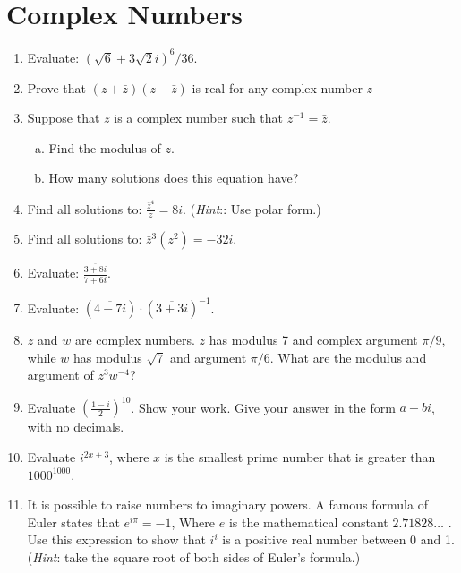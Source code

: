 \section{Complex Numbers}

\begin{enumerate}

\item
Evaluate: $(\sqrt{6}+3\sqrt{2}i)^6/36$.

\item
Prove that  $(z + \bar{z})(z - \bar{z})$ is real for any complex number $z$

\item
Suppose that $z$ is a complex number such that $z^{-1} = \bar{z}$.
\begin{enumerate}[(a)]
\item
 Find the modulus of $z$.
\item
How many solutions does this equation have?
\end{enumerate}
	
\item
Find all solutions to:  $\displaystyle{\frac{\bar{z}^4}{z} = 8i.}$
(\emph{Hint}:: Use polar form.)

\item
Find all solutions to:  $\bar{z}^3(z^2) = -32i.$
\item
Evaluate:  $\displaystyle{\frac{ \overline{3 + 8i} }{7 + 6i}}$.
\item
Evaluate:  $\displaystyle{( \overline{4 -7i} ) \cdot (\overline{3 + 3i})^{-1}}$.
\item
$z$ and $w$ are complex numbers. $z$ has modulus 7 and complex argument $\pi/9$, while $w$ has modulus $\sqrt{7}$ and argument $\pi/6$.  What are the modulus and argument of $z^3 w^{-4}$?

\item
Evaluate $\left(\frac{1-i}{2}\right)^{10}$.  Show your work. Give your answer in the form $a + bi$, with no decimals.

\item
Evaluate $ i^{2x+3}$, where $x$ is the smallest prime number that is greater than $1000^{1000}$.

\item
It is possible to raise numbers to imaginary powers.  A famous formula of Euler states that   
$e^{i\pi}= -1$, Where $e$ is the mathematical constant  $2.71828 \ldots$ .  Use this expression to show that $i^i$  is a positive real number between 0 and 1.  (\emph{Hint}: take the square root of both sides of Euler's formula.)


\end{enumerate}
